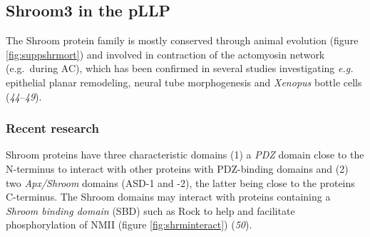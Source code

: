\documentclass[11pt,singlespacinge,twoside]{reedthesis} %
\theoremstyle{definition}
\theoremstyle{definition}
\theoremstyle{definition}
\theoremstyle{remark}
\begin{document}
\hypertarget{shroom3-in-the-pllp}{%
\subsection{Shroom3 in the pLLP}\label{shroom3-in-the-pllp}}

The Shroom protein family is mostly conserved through animal evolution (figure \ref{fig:suppshrmort}) and involved in contraction of the actomyosin network (e.g.~during AC), which has been confirmed in several studies investigating \emph{e.g.} epithelial planar remodeling, neural tube morphogenesis and \emph{Xenopus} bottle cells (\emph{44}--\emph{49}).

\hypertarget{intro-shroom}{%
\subsubsection{Recent research}\label{intro-shroom}}

Shroom proteins have three characteristic domains (1) a \emph{PDZ} domain close to the N-terminus to interact with other proteins with PDZ-binding domains and (2) two \emph{Apx/Shroom} domains (ASD-1 and -2), the latter being close to the proteins C-terminus. The Shroom domains may interact with proteins containing a \emph{Shroom binding domain} (SBD) such as Rock to help and facilitate phosphorylation of NMII (figure \ref{fig:shrminteract}) (\emph{50}).
\end{document}
